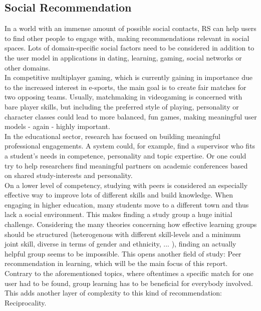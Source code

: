 \documentclass[conference]{IEEEtran}
\begin{document}
\subsection{Social Recommendation}\label{rw:socialrec}
In a world with an immense amount of possible social contacts, RS can help users to find other people to engage with, making recommendations relevant in social spaces. Lots of domain-specific social factors need to be considered in addition to the user model in applications in dating, learning, gaming, social networks or other domains.\\ 
In competitive multiplayer gaming, which is currently gaining in importance due to the increased interest in e-sports, the main goal is to create fair matches for two opposing teams. Usually, matchmaking in videogaming is concerned with bare player skills, but including the preferred style of playing, personality or character classes could lead to more balanced, fun games, making meaningful user models - again - highly important.\\
In the educational sector, research has focused on building meaningful professional engagements. A system could, for example, find a supervisor who fits a student's needs in competence, personality and topic expertise. \cite{zhang2016personality} Or one could try to help researchers find meaningful partners on academic conferences based on shared study-interests and personality. \cite{asabere2017improving}\\
On a lower level of competency, studying with peers is considered an especially effective way to improve lots of different skills and build knowledge. \cite{maxwell2008learning} When engaging in higher education, many students move to a different town and thus lack a social environment. This makes finding a study group a huge initial challenge. Considering the many theories concerning how effective learning groups should be structured (heterogenous with different skill-levels and a minimum joint skill, diverse in terms of gender and ethnicity, ... \cite{manske2015using, blumenfeld1996learning}), finding an actually helpful group seems to be impossible. This opens another field of study: Peer recommendation in learning, which will be the main focus of this report. \cite{potts2018reciprocal, olakanmi2017group}\\
Contrary to the aforementioned topics, where oftentimes a specific match for one user had to be found, group learning has to be beneficial for everybody involved. This adds another layer of complexity to this kind of recommendation: Reciprocality.\\
\end{document}

